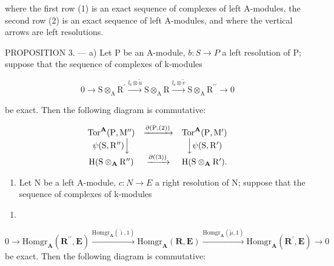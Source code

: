 where the first row (1) is an exact sequence of complexes of left A-modules, the second row (2) is an exact sequence of left A-modules, and where the vertical arrows are left resolutions.

PROPOSITION 3. --- a) Let P be an A-module, \(b: S \to P\) a left resolution of P; suppose that the sequence of complexes of k-modules

\[
0 \rightarrow \mathrm{S} \otimes_ {\mathrm{A}} \mathrm{R} ^ {\prime} \xrightarrow {l _ {\mathrm{s}} \otimes \tilde {u}} \mathrm{S} \otimes_ {\mathrm{A}} \mathrm{R} \xrightarrow {l _ {\mathrm{s}} \otimes \tilde {v}} \mathrm{S} \otimes_ {\mathrm{A}} \mathrm{R} ^ {\prime \prime} \rightarrow 0\tag{3}
\]

be exact. Then the following diagram is commutative:

\[
\begin{array}{c c c} \operatorname{Tor} ^ {\mathbf {A}} (\mathrm{P}, \mathrm{M} ^ {\prime \prime}) & \xrightarrow {\partial (\mathrm{P} , (2))} & \operatorname{Tor} ^ {\mathbf {A}} (\mathrm{P}, \mathrm{M} ^ {\prime}) \\ \psi (\mathrm{S}, \mathrm{R} ^ {\prime \prime}) \Big \downarrow & & \Big \downarrow \psi (\mathrm{S}, \mathrm{R} ^ {\prime}) \\ \mathrm{H} (\mathrm{S} \otimes_ {\mathbf {A}} \mathrm{R} ^ {\prime \prime}) & \xrightarrow {\partial ((3))} & \mathrm{H} (\mathrm{S} \otimes_ {\mathbf {A}} \mathrm{R} ^ {\prime}). \end{array}
\]

\begin{enumerate}
\def\labelenumi{\alph{enumi})}
\setcounter{enumi}{1}
\tightlist
\item
  Let N be a left A-module, \(c : N \to E\) a right resolution of N; suppose that the sequence of complexes of k-modules
\end{enumerate}

\begin{enumerate}
\def\labelenumi{(\arabic{enumi})}
\setcounter{enumi}{3}
\tightlist
\item
\end{enumerate}

\(0 \to \text{Homgr}_{\mathbf{A}}(\mathbf{R}^{\prime \prime}, \mathbf{E}) \xrightarrow{\text{Homgr}_{\mathbf{A}}(\tilde{\imath}, 1)} \text{Homgr}_{\mathbf{A}}(\mathbf{R}, \mathbf{E}) \xrightarrow{\text{Homgr}_{\mathbf{A}}(\tilde{\mu}, 1)} \text{Homgr}_{\mathbf{A}}(\mathbf{R}^{\prime}, \mathbf{E}) \to 0\) be exact. Then the following diagram is commutative:

